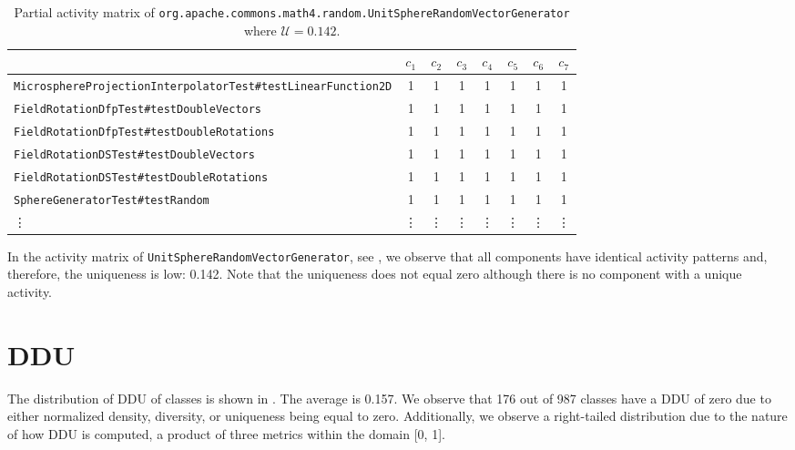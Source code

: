 \documentclass[twoside,a4paper,11pt]{memoir}
\begin{document}
\begin{table}[]
\scriptsize
\centering
\caption{Partial activity matrix of \texttt{org.\-apache.\-commons.\-math4.\-random.\-Unit\-Sphere\-Random\-Vector\-Generator} where \(\mathcal{U} = 0.142\).}%
\label{tab:unitsphere}
\begin{tabular}{l|ccccccc}
 & \(c_1 \) & \(c_2 \) & \(c_3 \) & \(c_4 \) & \(c_5 \) & \(c_6 \) & \(c_7 \) \\ \hline
\texttt{MicrosphereProjectionInterpolatorTest\#testLinearFunction2D} & 1 & 1 & 1 & 1 & 1 & 1 & 1 \\
\texttt{FieldRotationDfpTest\#testDoubleVectors} & 1 & 1 & 1 & 1 & 1 & 1 & 1 \\
\texttt{FieldRotationDfpTest\#testDoubleRotations} & 1 & 1 & 1 & 1 & 1 & 1 & 1 \\
\texttt{FieldRotationDSTest\#testDoubleVectors} & 1 & 1 & 1 & 1 & 1 & 1 & 1 \\
\texttt{FieldRotationDSTest\#testDoubleRotations} & 1 & 1 & 1 & 1 & 1 & 1 & 1 \\
\texttt{SphereGeneratorTest\#testRandom} & 1 & 1 & 1 & 1 & 1 & 1 & 1 \\
\vdots & \vdots & \vdots & \vdots & \vdots & \vdots & \vdots & \vdots
\end{tabular}
\end{table}

In the activity matrix of \texttt{Unit\-Sphere\-Random\-Vector\-Generator}, see , we observe that all components have identical activity patterns and, therefore, the uniqueness is low: 0.142.
Note that the uniqueness does not equal zero although there is no component with a unique activity.

\section{DDU}

The distribution of DDU of classes is shown in .
The average is 0.157.
We observe that 176 out of 987 classes have a DDU of zero due to either normalized density, diversity, or uniqueness being equal to zero.
Additionally, we observe a right-tailed distribution due to the nature of how DDU is computed, a product of three metrics within the domain [0, 1].
\end{document}
